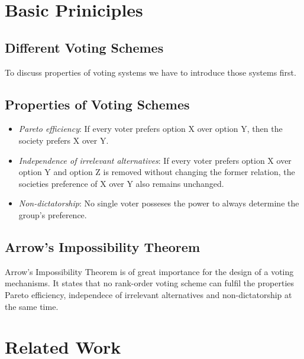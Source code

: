 \documentclass[conference]{IEEEtran}
\begin{document}
\section{Basic Priniciples}\label{2BasicPrinciples}

\subsection{Different Voting Schemes}
To discuss properties of voting systems we have to introduce those systems first.

\subsection{Properties of Voting Schemes}
\begin{itemize}
    \item \textit{Pareto efficiency}: If every voter prefers option X over option Y, then the society prefers X over Y.
    \item \textit{Independence of irrelevant alternatives}: If every voter prefers option X over option Y and option Z is removed without changing the former relation, the societies preference of X over Y also remains unchanged.
    \item \textit{Non-dictatorship}: No single voter posseses the power to always determine the group's preference.
\end{itemize}

\subsection{Arrow's Impossibility Theorem}
Arrow's Impossibility Theorem is of great importance for the design of a voting mechanisms. It states that no rank-order voting scheme can fulfil the properties Pareto efficiency, independece of irrelevant alternatives and non-dictatorship at the same time.

\section{Related Work}\label{3RelatedWork}





\vspace{12pt}
\end{document}
